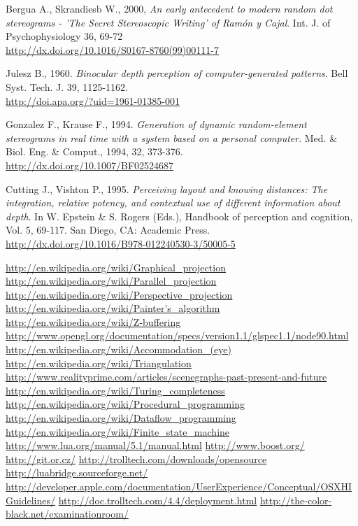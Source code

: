 \begin{thebibliography}{12}
Bergua A., Skrandiesb W., 2000,
\textit{An early antecedent to modern random dot stereograms - 'The Secret Stereoscopic Writing' of Ram\'on y Cajal}.
Int. J. of Psychophysiology 36, 69-72\\
\url{http://dx.doi.org/10.1016/S0167-8760(99)00111-7}

Julesz B., 1960.
\textit{Binocular depth perception of computer-generated patterns}.
Bell Syst. Tech. J. 39, 1125-1162.\\
\url{http://doi.apa.org/?uid=1961-01385-001}

Gonzalez F., Krause F., 1994.
\textit{Generation of dynamic random-element stereograms in real time with a system based on a personal computer}.
Med. \& Biol. Eng. \& Comput., 1994, 32, 373-376.\\
\url{http://dx.doi.org/10.1007/BF02524687}

Cutting J., Vishton P., 1995.
\textit{Perceiving layout and knowing distances: The integration, relative potency, and contextual use of different information about depth}.
In W. Epstein \& S. Rogers (Eds.), Handbook of perception and cognition, Vol. 5, 69-117. San Diego, CA: Academic Press.\\
\url{http://dx.doi.org/10.1016/B978-012240530-3/50005-5}

\end{thebibliography}

\renewcommand*\refname{Links}

\begin{thebibliography}{12}
 \url{http://en.wikipedia.org/wiki/Graphical_projection}
 \url{http://en.wikipedia.org/wiki/Parallel_projection}
 \url{http://en.wikipedia.org/wiki/Perspective_projection}
 \url{http://en.wikipedia.org/wiki/Painter's_algorithm}
 \url{http://en.wikipedia.org/wiki/Z-buffering}
 \url{http://www.opengl.org/documentation/specs/version1.1/glspec1.1/node90.html}
 \url{http://en.wikipedia.org/wiki/Accommodation_(eye)}
 \url{http://en.wikipedia.org/wiki/Triangulation}
 \url{http://www.realityprime.com/articles/scenegraphs-past-present-and-future}
 \url{http://en.wikipedia.org/wiki/Turing_completeness}
 \url{http://en.wikipedia.org/wiki/Procedural_programming}
 \url{http://en.wikipedia.org/wiki/Dataflow_programming}
 \url{http://en.wikipedia.org/wiki/Finite_state_machine}
 \url{http://www.lua.org/manual/5.1/manual.html}
 \url{http://www.boost.org/}
 \url{http://git.or.cz/}
 \url{http://trolltech.com/downloads/opensource}
 \url{http://luabridge.sourceforge.net/}
 \url{http://developer.apple.com/documentation/UserExperience/Conceptual/OSXHIGuidelines/}
 \url{http://doc.trolltech.com/4.4/deployment.html}
 \url{http://the-color-black.net/examinationroom/}
\end{thebibliography}
